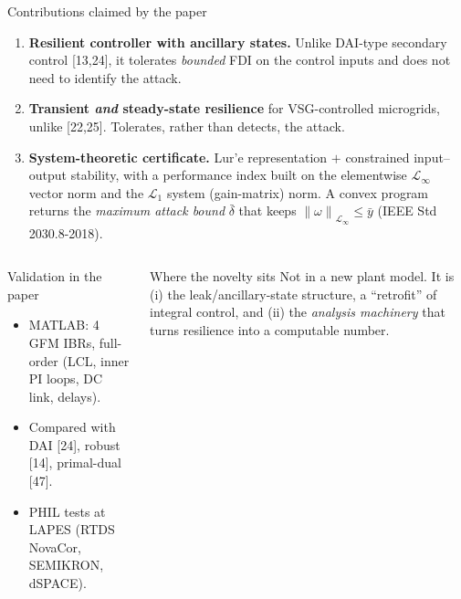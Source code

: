 \documentclass[aspectratio=169,9pt]{beamer}
\newcommand{\norm}[1]{\left\|#1\right\|}
\newcommand{\Linf}{\mathcal{L}_\infty}
\newcommand{\Lone}{\mathcal{L}_1}
\begin{document}
\begin{frame}[t]{Contributions claimed by the paper}
\footnotesize
\begin{enumerate}
\item \textbf{Resilient controller with ancillary states.} Unlike DAI-type secondary control [13,24], it tolerates \emph{bounded} FDI on the control inputs and does not need to identify the attack.
\item \textbf{Transient \emph{and} steady-state resilience} for VSG-controlled microgrids, unlike [22,25]. Tolerates, rather than detects, the attack.
\item \textbf{System-theoretic certificate.} Lur'e representation $+$ constrained input--output stability, with a performance index built on the elementwise $\Linf$ vector norm and the $\Lone$ system (gain-matrix) norm. A convex program returns the \emph{maximum attack bound} $\bar\delta$ that keeps $\norm{\omega}_{\Linf}\le\bar y$ (IEEE Std 2030.8-2018).
\end{enumerate}
\vspace{0.2cm}
\begin{columns}[T]
\begin{exampleblock}{Validation in the paper}\footnotesize
\begin{itemize}
\item MATLAB: 4 GFM IBRs, full-order (LCL, inner PI loops, DC link, delays).
\item Compared with DAI [24], robust [14], primal-dual [47].
\item PHIL tests at LAPES (RTDS NovaCor, SEMIKRON, dSPACE).
\end{itemize}
\end{exampleblock}
\begin{block}{Where the novelty sits}\footnotesize
Not in a new plant model. It is (i) the leak/ancillary-state structure, a ``retrofit'' of integral control, and (ii) the \emph{analysis machinery} that turns resilience into a computable number.
\end{block}
\end{columns}
\end{frame}
\end{document}

